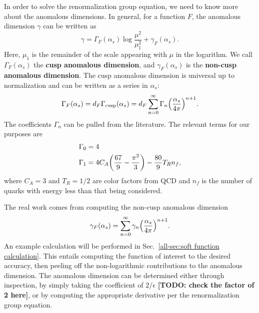 \documentclass[../thesis.tex]{subfiles}
\providecommand{\cusp}{\mathrm{cusp}}
\begin{document}
	In order to solve the renormalization group equation, we need to know more about the anomalous dimensions. In general, for a function $F$, the anomalous dimension $\gamma$ can be written as \cite{frye_factorization_2016}
	\begin{equation}\label{all-eq:general anomalous dimension}
		\gamma = \Gamma_F(\alpha_s) \log\frac{\mu^2}{\mu_1^2} + \gamma_F(\alpha_s).
	\end{equation}
	Here, $\mu_1$ is the remainder of the scale appearing with $\mu$ in the logarithm. We call $\Gamma_F(\alpha_s)$ the \textbf{cusp anomalous dimension}, and $\gamma_F(\alpha_s)$ is the \textbf{non-cusp anomalous dimension}. The cusp anomalous dimension is universal up to normalization and can be written as a series in $\alpha_s$:
	\begin{equation}\label{all-eq:general cusp anomalous dimension}
		\Gamma_F(\alpha_s) = d_F \Gamma_\cusp(\alpha_s) = d_F \sum_{n = 0}^\infty \Gamma_n \qty(\frac{\alpha_s}{4\pi})^{n + 1}.
	\end{equation}
	The coefficients $\Gamma_n$ can be pulled from the literature. The relevant terms for our purposes are \cite{frye_factorization_2016}
	\begin{equation}\label{all-eq:Gamma values}
	\begin{aligned}
		\Gamma_0 &= 4 \\
		\Gamma_1 &= 4C_A \qty(\frac{67}{9} - \frac{\pi^2}{3}) - \frac{80}{9}T_R n_f,
	\end{aligned}
	\end{equation}
	where $C_A = 3$ and $T_R = 1/2$ are color factors from QCD and $n_f$ is the number of quarks with energy less than that being considered.

	The real work comes from computing the non-cusp anomalous dimension
	\begin{equation}\label{all-eq:general non-cusp anomalous dimension}
		\gamma_F(\alpha_s) = \sum_{n = 0}^\infty \gamma_n \qty(\frac{\alpha_s}{4\pi})^{n + 1}.
	\end{equation}
	An example calculation will be performed in Sec.~\ref{all-sec:soft function calculation}. This entails computing the function of interest to the desired accuracy, then peeling off the non-logarithmic contributions to the anomalous dimension. The anomalous dimension can be determined either through inspection, by simply taking the coefficient of $2/\epsilon$ {\color{red}\textbf{[TODO: check the factor of 2 here]}}, or by computing the appropriate derivative per the renormalization group equation.
\end{document}

